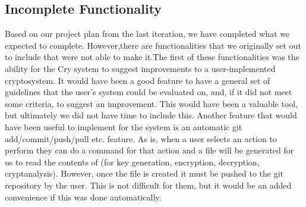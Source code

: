 \subsection{Incomplete Functionality}

Based on our project plan from the last iteration, we have
completed what we expected to complete. However,there are
functionalities that we originally set out to include that
were not able to make it.The first of these functionalities
was the ability for the Cry system to suggest improvements
to a user-implemented cryptosystem. It would have been a
good feature to have a general set of guidelines that the
user's system could be evaluated on, and, if it did not meet
some criteria, to suggest an improvement. This would have
been a valuable tool, but ultimately we did not have time to
include this. Another feature that would have been useful to
implement for the system is an automatic git
add/commit/push/pull etc. feature. As is, when a user
selects an action to perform they can do a command for that
action and a file will be generated for us to read the
contents of (for key generation, encryption, decryption,
cryptanalysis). However, once the file is created it must be
pushed to the git repository by the user. This is not
difficult for them, but it would be an added convenience if
this was done automatically.

